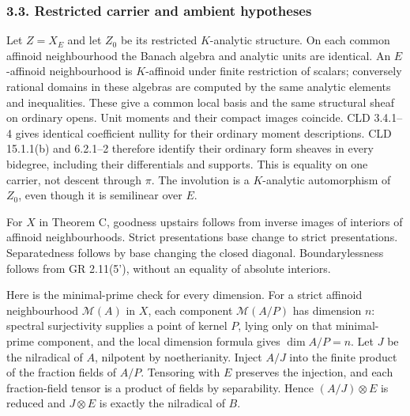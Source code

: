 \documentclass[
  11pt,
]{article}
\begin{document}
\subsubsection{3.3. Restricted carrier and ambient
hypotheses}\label{restricted-carrier-and-ambient-hypotheses}

Let \(Z=X_E\) and let \(Z_0\) be its restricted \(K\)-analytic
structure. On each common affinoid neighbourhood the Banach algebra and
analytic units are identical. An \(E\)-affinoid neighbourhood is
\(K\)-affinoid under finite restriction of scalars; conversely rational
domains in these algebras are computed by the same analytic elements and
inequalities. These give a common local basis and the same structural
sheaf on ordinary opens. Unit moments and their compact images coincide.
CLD 3.4.1--4 gives identical coefficient nullity for their ordinary
moment descriptions. CLD 15.1.1(b) and 6.2.1--2 therefore identify their
ordinary form sheaves in every bidegree, including their differentials
and supports. This is equality on one carrier, not descent through
\(\pi\). The involution is a \(K\)-analytic automorphism of \(Z_0\),
even though it is semilinear over \(E\).

For \(X\) in Theorem C, goodness upstairs follows from inverse images of
interiors of affinoid neighbourhoods. Strict presentations base change
to strict presentations. Separatedness follows by base changing the
closed diagonal. Boundarylessness follows from GR 2.11(5'), without an
equality of absolute interiors.

Here is the minimal-prime check for every dimension. For a strict
affinoid neighbourhood \(\mathcal M(A)\) in \(X\), each component
\(\mathcal M(A/P)\) has dimension \(n\): spectral surjectivity supplies
a point of kernel \(P\), lying only on that minimal-prime component, and
the local dimension formula gives \(\dim A/P=n\). Let \(J\) be the
nilradical of \(A\), nilpotent by noetherianity. Inject \(A/J\) into the
finite product of the fraction fields of \(A/P\). Tensoring with \(E\)
preserves the injection, and each fraction-field tensor is a product of
fields by separability. Hence \((A/J)\otimes E\) is reduced and
\(J\otimes E\) is exactly the nilradical of \(B\).
\end{document}
